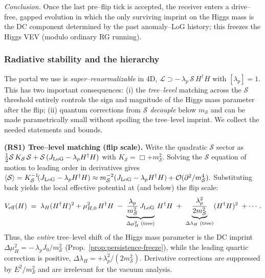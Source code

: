 \documentclass[10pt]{article}
\theoremstyle{definition}
\theoremstyle{plain}
\begin{document}
\medskip\noindent
\emph{Conclusion.} Once the last pre–flip tick is accepted, the receiver enters a drive–free, gapped evolution in which the only surviving imprint on the Higgs mass is the DC component determined by the past anomaly–LoG history; this freezes the Higgs VEV (modulo ordinary RG running).



\subsubsection*{Radiative stability and the hierarchy}
\label{subsubsec:radiative-stability}
The portal we use is \emph{super–renormalizable} in 4D,
\(
\mathcal L\supset -\,\lambda_p\,\mathcal S\,H^\dagger H
\)
with $[\lambda_p]=1$. This has two important consequences:
(i) the \emph{tree–level} matching across the $\mathcal S$ threshold entirely controls the sign and
magnitude of the Higgs mass parameter after the flip; (ii) quantum corrections from $\mathcal S$ \emph{decouple}
below $m_{\mathcal S}$ and can be made parametrically small without spoiling the tree–level imprint.
We collect the needed statements and bounds.

\medskip
\noindent\textbf{(RS1) Tree–level matching (flip scale).}
Write the quadratic $\mathcal S$ sector as
\(
\frac12\mathcal S\,K_{\mathcal S}\,\mathcal S+\mathcal S\,(J_{\rm LoG}-\lambda_p H^\dagger H)
\)
with $K_{\mathcal S}=\Box+m_{\mathcal S}^2$.
Solving the $\mathcal S$ equation of motion to leading order in derivatives gives
\(
\langle\mathcal S\rangle = K_{\mathcal S}^{-1}\!(J_{\rm LoG}-\lambda_p H^\dagger H)
\approx m_{\mathcal S}^{-2}(J_{\rm LoG}-\lambda_p H^\dagger H)+\mathcal O(\partial^2/m_{\mathcal S}^4).
\)
Substituting back yields the local effective potential at (and below) the flip scale:
\begin{equation}
\label{eq:Veff-matching}
V_{\rm eff}(H)\;=\;\lambda_H(H^\dagger H)^2+\mu_{H,0}^2\,H^\dagger H
\;-\;\underbrace{\frac{\lambda_p}{m_{\mathcal S}^2}\,J_{\rm LoG}}_{\Delta\mu_H^2\text{ (tree)}}\,H^\dagger H
\;+\;\underbrace{\frac{\lambda_p^2}{2m_{\mathcal S}^2}}_{\Delta\lambda_H\text{ (tree)}}(H^\dagger H)^2\;+\cdots.
\end{equation}
Thus, the \emph{entire} tree–level shift of the Higgs mass parameter is the DC imprint
\(
\Delta\mu_H^2= -\,\lambda_p J_0/m_{\mathcal S}^2
\)
(Prop.~\ref{prop:persistence-freeze}), while the leading quartic correction is positive,
$\Delta\lambda_H=+\lambda_p^2/(2m_{\mathcal S}^2)$. Derivative corrections are suppressed by
$E^2/m_{\mathcal S}^2$ and are irrelevant for the vacuum analysis.
\end{document}
